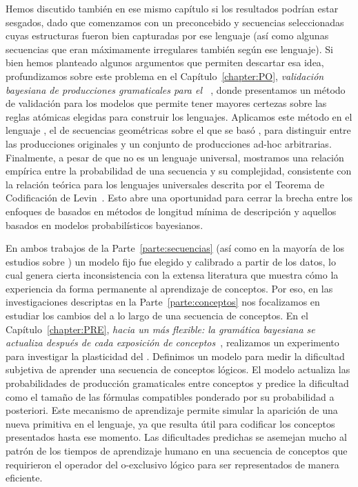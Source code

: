 Hemos discutido también en ese mismo capítulo si los resultados podrían estar sesgados, dado que comenzamos con un \lot preconcebido y secuencias seleccionadas cuyas estructuras fueron bien capturadas por ese lenguaje (así como algunas secuencias que eran máximamente irregulares también según ese lenguaje). Si bien hemos planteado algunos argumentos que permiten descartar esa idea, profundizamos sobre este problema en el Capítulo~\ref{chapter:PO}, \textit{validación bayesiana de producciones gramaticales para el \lot~\cite{romano2018bayesian}}, donde presentamos un método de validación para los modelos \lot que permite tener mayores certezas sobre las reglas atómicas elegidas para construir los lenguajes. Aplicamos este método en el lenguaje \gramgeo, el \lot de secuencias geométricas sobre el que se basó \grambin, para distinguir entre las producciones originales y un conjunto de producciones ad-hoc arbitrarias. Finalmente, a pesar de que \gramgeo no es un lenguaje universal, mostramos una relación empírica entre la probabilidad de una secuencia y su complejidad, consistente con la relación teórica para los lenguajes universales descrita por el Teorema de Codificación de Levin~\cite{levin1974laws}. Esto abre una oportunidad para cerrar la brecha entre los enfoques de \lot basados en métodos de longitud mínima de descripción y aquellos basados en modelos probabilísticos bayesianos.

En ambos trabajos de la Parte~\ref{parte:secuencias} (así como en la mayoría de los estudios sobre \lot) un modelo fijo fue elegido y calibrado a partir de los datos, lo cual genera cierta inconsistencia con la extensa literatura que muestra cómo la experiencia da forma permanente al aprendizaje de conceptos. Por eso, en las investigaciones descriptas en la Parte~\ref{parte:conceptos} nos focalizamos en estudiar los cambios del \lot a lo largo de una secuencia de conceptos. En el Capítulo~\ref{chapter:PRE}, \textit{hacia un \lot más flexible: la gramática bayesiana se actualiza después de cada exposición de conceptos~\cite{tano2020towards}}, realizamos un experimento para investigar la plasticidad del \lot. Definimos un modelo para medir la dificultad subjetiva de aprender una secuencia de conceptos lógicos. El modelo actualiza las probabilidades de producción gramaticales entre conceptos y predice la dificultad como el tamaño de las fórmulas compatibles ponderado por su probabilidad a posteriori. Este mecanismo de aprendizaje permite simular la aparición de una nueva primitiva en el lenguaje, ya que resulta útil para codificar los conceptos presentados hasta ese momento. Las dificultades predichas se asemejan mucho al patrón de los tiempos de aprendizaje humano en una secuencia de conceptos que requirieron el operador del o-exclusivo lógico para ser representados de manera eficiente.

